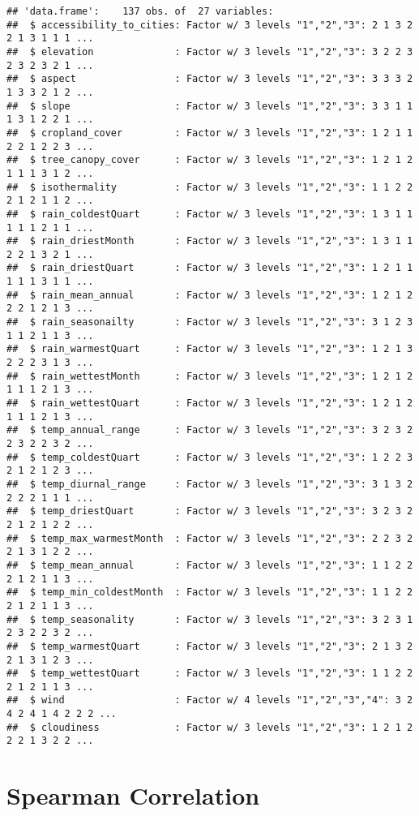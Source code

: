 \documentclass[]{book}
\begin{document}
\begin{verbatim}
## 'data.frame':    137 obs. of  27 variables:
##  $ accessibility_to_cities: Factor w/ 3 levels "1","2","3": 2 1 3 2 2 1 3 1 1 1 ...
##  $ elevation              : Factor w/ 3 levels "1","2","3": 3 2 2 3 2 3 2 3 2 1 ...
##  $ aspect                 : Factor w/ 3 levels "1","2","3": 3 3 3 2 1 3 3 2 1 2 ...
##  $ slope                  : Factor w/ 3 levels "1","2","3": 3 3 1 1 1 3 1 2 2 1 ...
##  $ cropland_cover         : Factor w/ 3 levels "1","2","3": 1 2 1 1 2 2 1 2 2 3 ...
##  $ tree_canopy_cover      : Factor w/ 3 levels "1","2","3": 1 2 1 2 1 1 1 3 1 2 ...
##  $ isothermality          : Factor w/ 3 levels "1","2","3": 1 1 2 2 2 1 2 1 1 2 ...
##  $ rain_coldestQuart      : Factor w/ 3 levels "1","2","3": 1 3 1 1 1 1 1 2 1 1 ...
##  $ rain_driestMonth       : Factor w/ 3 levels "1","2","3": 1 3 1 1 2 2 1 3 2 1 ...
##  $ rain_driestQuart       : Factor w/ 3 levels "1","2","3": 1 2 1 1 1 1 1 3 1 1 ...
##  $ rain_mean_annual       : Factor w/ 3 levels "1","2","3": 1 2 1 2 2 2 1 2 1 3 ...
##  $ rain_seasonailty       : Factor w/ 3 levels "1","2","3": 3 1 2 3 1 1 2 1 1 3 ...
##  $ rain_warmestQuart      : Factor w/ 3 levels "1","2","3": 1 2 1 3 2 2 2 3 1 3 ...
##  $ rain_wettestMonth      : Factor w/ 3 levels "1","2","3": 1 2 1 2 1 1 1 2 1 3 ...
##  $ rain_wettestQuart      : Factor w/ 3 levels "1","2","3": 1 2 1 2 1 1 1 2 1 3 ...
##  $ temp_annual_range      : Factor w/ 3 levels "1","2","3": 3 2 3 2 2 3 2 2 3 2 ...
##  $ temp_coldestQuart      : Factor w/ 3 levels "1","2","3": 1 2 2 3 2 1 2 1 2 3 ...
##  $ temp_diurnal_range     : Factor w/ 3 levels "1","2","3": 3 1 3 2 2 2 2 1 1 1 ...
##  $ temp_driestQuart       : Factor w/ 3 levels "1","2","3": 3 2 3 2 2 1 2 1 2 2 ...
##  $ temp_max_warmestMonth  : Factor w/ 3 levels "1","2","3": 2 2 3 2 2 1 3 1 2 2 ...
##  $ temp_mean_annual       : Factor w/ 3 levels "1","2","3": 1 1 2 2 2 1 2 1 1 3 ...
##  $ temp_min_coldestMonth  : Factor w/ 3 levels "1","2","3": 1 1 2 2 2 1 2 1 1 3 ...
##  $ temp_seasonality       : Factor w/ 3 levels "1","2","3": 3 2 3 1 2 3 2 2 3 2 ...
##  $ temp_warmestQuart      : Factor w/ 3 levels "1","2","3": 2 1 3 2 2 1 3 1 2 3 ...
##  $ temp_wettestQuart      : Factor w/ 3 levels "1","2","3": 1 1 2 2 2 1 2 1 1 3 ...
##  $ wind                   : Factor w/ 4 levels "1","2","3","4": 3 2 4 2 4 1 4 2 2 2 ...
##  $ cloudiness             : Factor w/ 3 levels "1","2","3": 1 2 1 2 2 2 1 3 2 2 ...
\end{verbatim}

\hypertarget{spearman-correlation}{%
\section{Spearman Correlation}\label{spearman-correlation}}
\end{document}
